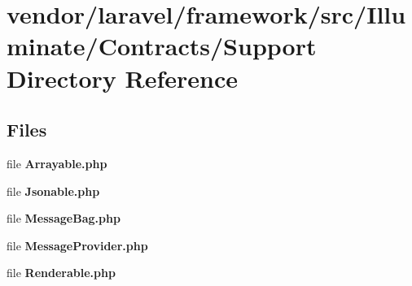 \section{vendor/laravel/framework/src/\+Illuminate/\+Contracts/\+Support Directory Reference}
\label{dir_919a384366ac68be7916410bf04ea004}
\subsection*{Files}
\begin{DoxyCompactItemize}
\item 
file {\bf Arrayable.\+php}
\item 
file {\bf Jsonable.\+php}
\item 
file {\bf Message\+Bag.\+php}
\item 
file {\bf Message\+Provider.\+php}
\item 
file {\bf Renderable.\+php}
\end{DoxyCompactItemize}
